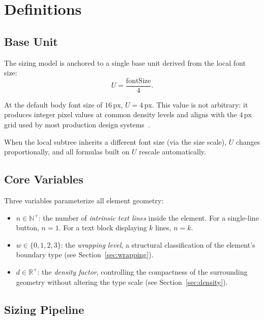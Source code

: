 \section{Definitions}
\label{sec:definitions}

\subsection{Base Unit}

The sizing model is anchored to a single base unit derived from the local font size:
\begin{equation}
U = \frac{\text{fontSize}}{4}.
\end{equation}

At the default body font size of $16\,\text{px}$, $U = 4\,\text{px}$. This value is not arbitrary: it produces integer pixel values at common density levels and aligns with the $4\,\text{px}$ grid used by most production design systems~\cite{dahl2017}.

When the local subtree inherits a different font size (via the size scale), $U$ changes proportionally, and all formulas built on $U$ rescale automatically.

\subsection{Core Variables}

Three variables parameterize all element geometry:

\begin{itemize}
  \item $n \in \mathbb{N}^+$: the number of \emph{intrinsic text lines} inside the element. For a single-line button, $n = 1$. For a text block displaying $k$ lines, $n = k$.

  \item $w \in \{0, 1, 2, 3\}$: the \emph{wrapping level}, a structural classification of the element's boundary type (see Section~\ref{sec:wrapping}).

  \item $d \in \mathbb{R}^+$: the \emph{density factor}, controlling the compactness of the surrounding geometry without altering the type scale (see Section~\ref{sec:density}).
\end{itemize}

\subsection{Sizing Pipeline}

